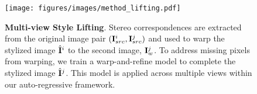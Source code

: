 \begin{figure}[t!]
\centering
\texttt{[image: figures/images/method\_lifting.pdf]}
\caption{\textbf{Multi-view Style Lifting}. Stereo correspondences are extracted from the original image pair $(\mathbf{I}_{src}^i, \mathbf{I}_{src}^j)$ and used to warp the stylized image $\hat{\mathbf{I}}^i$ to the second image, $\mathbf{I}^j_w$. To address missing pixels from warping, we train a warp-and-refine model to complete the stylized image $\hat{\mathbf{I}}^j$. This model is applied across multiple views within our auto-regressive framework.}
\label{fig:method_lifting}
\end{figure}
